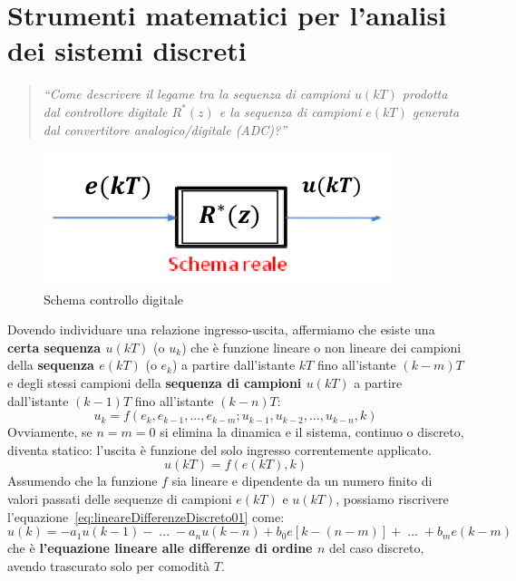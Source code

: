 \documentclass[a4paper]{report}
\newcommand{\bo}{\bfseries }
\begin{document}
\section{Strumenti matematici per l'analisi dei sistemi discreti}
\begin{quote}
  {\em ``Come descrivere il legame tra la sequenza di campioni $u(kT)$
    prodotta dal controllore digitale $R^*(z)$ e la sequenza di campioni
    $e(kT)$ generata dal convertitore analogico/digitale (ADC)?''
  }
\end{quote}
\begin{figure}[!hbp]
  \begin{center}
    \includegraphics[scale=0.5]{./figures/controlloDigitaleSchemaReale}
    \caption{Schema controllo
      digitale}\label{fig:controlloDigitaleSchemaReale} 
  \end{center}
\end{figure}
Dovendo individuare una relazione ingresso-uscita, affermiamo che
esiste una {\bo certa sequenza $u(kT)$} (o $u_k$) che \`e funzione
lineare o non lineare dei campioni della {\bo sequenza $e(kT)$} (o $e_k$)
a partire dall'istante $kT$ fino all'istante $(k - m)T$ e degli stessi
campioni della {\bo sequenza di campioni $u(kT)$} a partire dall'istante $(k
- 1)T$ fino all'istante $(k - n)T$:
\begin{equation}\label{eq:lineareDifferenzeDiscreto01}
  u_k = f(e_k, e_{k-1}, ... , e_{k-m};u_{k-1}, u_{k-2}, ..., u_{k-n}, k)
\end{equation}
Ovviamente, se $n = m = 0$ si elimina la dinamica e il sistema,
continuo o discreto, diventa statico: l'uscita \`e funzione del solo
ingresso correntemente applicato.
\[
u(kT) = f(e(kT), k)
\]
Assumendo che la funzione $f$ sia lineare e dipendente da un
numero finito di valori passati delle sequenze di campioni $e(kT)$ e
$u(kT)$, possiamo riscrivere
l'equazione~\ref{eq:lineareDifferenzeDiscreto01} come:
\begin{equation}\label{eq:lineareDifferenzeDiscreto02}
  u(k) = - a_1 u (k - 1) - \;...\; - a_n u (k - n) + b_0 e [k - (n -
    m)] + \;...\; + b_m e (k - m)
\end{equation}
che \`e {\bo l'equazione lineare alle differenze di ordine
  $n$} del caso
discreto, avendo trascurato solo per comodit\`a $T$.
\end{document}
